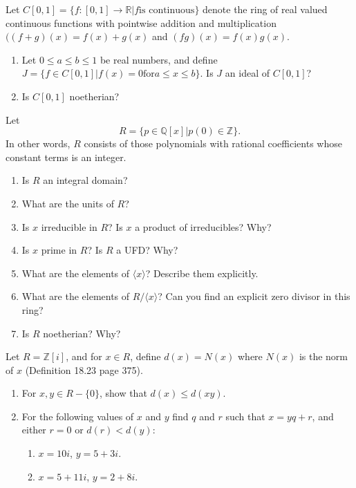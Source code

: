 \documentclass[12pt,letterpaper,boxed]{hmcpset}
\begin{document}

\begin{problem}[18.2.6]
Let $C[0,1] = \{f:[0,1] \rightarrow \mathbb{R} \vert f \text{is continuous}\}$ denote the ring of real valued continuous functions with pointwise addition and multiplication $((f+g)(x) = f(x)+g(x)$ and $(fg)(x) = f(x)g(x)$. 
\begin{enumerate}[label=\alph*]
\item Let $0 \leq a \leq b \leq 1$ be real numbers, and define $J = \{ f\in C[0,1] \vert f(x) = 0 \text{for} a \leq x \leq b\}$. Is $J$ an ideal of $C[0,1]$?
\item Is $C[0,1]$ noetherian?
\end{enumerate}
\end{problem}

\begin{solution}
\end{solution}

\clearpage

\begin{problem}[18.3.13]
Let $$R = \{p \in \mathbb{Q}[x] \vert p(0) \in \mathbb{Z}\}.$$
In other words, $R$ consists of those polynomials with rational coefficients whose constant terms is an integer.
\begin{enumerate}[label=\alph*]
\item Is $R$ an integral domain?
\item What are the units of $R$?
\item Is $x$ irreducible in $R$? Is $x$ a product of irreducibles? Why?
\item Is $x$ prime in $R$? Is $R$ a UFD? Why?
\item What are the elements of $\langle x \rangle$? Describe them explicitly.
\item What are the elements of $R/\langle x \rangle$? Can you find an explicit zero divisor in this ring?
\item Is $R$ noetherian? Why?
\end{enumerate}
\end{problem}

\begin{solution}
\end{solution}

\clearpage

\begin{problem}[18.4.6]
Let $R = \mathbb{Z}[i]$, and for $x \in R$, define $d(x) = N(x)$ where $N(x)$ is the norm of $x$ (Definition 18.23 page 375).
\begin{enumerate}[label=\alph*]
\item For $x,y \in R - \{0\}$, show that $d(x) \leq d(xy)$.
\item For the following values of $x$ and $y$ find $q$ and $r$ such that $x = yq+r$, and either $r = 0$ or $d(r) < d(y)$:
\begin{enumerate}
\item $x = 10i$, $y = 5+3i$.
\item $x = 5+11i$, $y = 2+8i$.
\end{enumerate}
\end{enumerate}
\end{problem}
\end{document}
